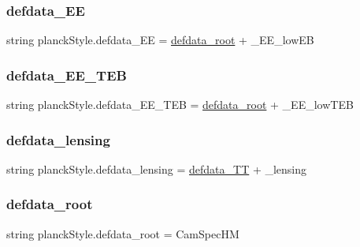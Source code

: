 \subsubsection{\texorpdfstring{defdata\+\_\+\+EE}{defdata\_EE}}
{\footnotesize\ttfamily string planck\+Style.\+defdata\+\_\+\+EE = \mbox{\hyperlink{namespaceplanckStyle_a0e660a6b993d079309a2b0f97276e0d3}{defdata\+\_\+root}} + \textquotesingle{}\+\_\+\+E\+E\+\_\+low\+EB\textquotesingle{}}

\mbox{\label{namespaceplanckStyle_a3b6e393ac055ea3838239a5286916db0}} 
\subsubsection{\texorpdfstring{defdata\+\_\+\+E\+E\+\_\+\+T\+EB}{defdata\_EE\_TEB}}
{\footnotesize\ttfamily string planck\+Style.\+defdata\+\_\+\+E\+E\+\_\+\+T\+EB = \mbox{\hyperlink{namespaceplanckStyle_a0e660a6b993d079309a2b0f97276e0d3}{defdata\+\_\+root}} + \textquotesingle{}\+\_\+\+E\+E\+\_\+low\+T\+EB\textquotesingle{}}

\mbox{\label{namespaceplanckStyle_a313a4de00b6651d5ead8b86a584adb63}} 
\subsubsection{\texorpdfstring{defdata\+\_\+lensing}{defdata\_lensing}}
{\footnotesize\ttfamily string planck\+Style.\+defdata\+\_\+lensing = \mbox{\hyperlink{namespaceplanckStyle_ae9a486070a1102293ca26bf924f115e2}{defdata\+\_\+\+TT}} + \textquotesingle{}\+\_\+lensing\textquotesingle{}}

\mbox{\label{namespaceplanckStyle_a0e660a6b993d079309a2b0f97276e0d3}} 
\subsubsection{\texorpdfstring{defdata\+\_\+root}{defdata\_root}}
{\footnotesize\ttfamily string planck\+Style.\+defdata\+\_\+root = \textquotesingle{}Cam\+Spec\+HM\textquotesingle{}}

